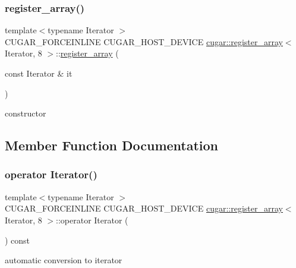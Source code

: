 \subsubsection{\texorpdfstring{register\+\_\+array()}{register\_array()}\hspace{0.1cm}{\footnotesize\ttfamily [2/2]}}
{\footnotesize\ttfamily template$<$typename Iterator $>$ \\
C\+U\+G\+A\+R\+\_\+\+F\+O\+R\+C\+E\+I\+N\+L\+I\+NE C\+U\+G\+A\+R\+\_\+\+H\+O\+S\+T\+\_\+\+D\+E\+V\+I\+CE \hyperlink{structcugar_1_1register__array}{cugar\+::register\+\_\+array}$<$ Iterator, 8 $>$\+::\hyperlink{structcugar_1_1register__array}{register\+\_\+array} (\begin{DoxyParamCaption}\item[{const Iterator \&}]{it }\end{DoxyParamCaption})\hspace{0.3cm}{\ttfamily [inline]}}

constructor 

\subsection{Member Function Documentation}
\mbox{\label{structcugar_1_1register__array_3_01_iterator_00_018_01_4_a0b6bfec019bb18d2e11d566b13b64bc2}} 
\subsubsection{\texorpdfstring{operator Iterator()}{operator Iterator()}}
{\footnotesize\ttfamily template$<$typename Iterator $>$ \\
C\+U\+G\+A\+R\+\_\+\+F\+O\+R\+C\+E\+I\+N\+L\+I\+NE C\+U\+G\+A\+R\+\_\+\+H\+O\+S\+T\+\_\+\+D\+E\+V\+I\+CE \hyperlink{structcugar_1_1register__array}{cugar\+::register\+\_\+array}$<$ Iterator, 8 $>$\+::operator Iterator (\begin{DoxyParamCaption}{ }\end{DoxyParamCaption}) const\hspace{0.3cm}{\ttfamily [inline]}}

automatic conversion to iterator \mbox{\label{structcugar_1_1register__array_3_01_iterator_00_018_01_4_ae6cf277b9a7bf0ac688103bb4f5bd5db}} 
